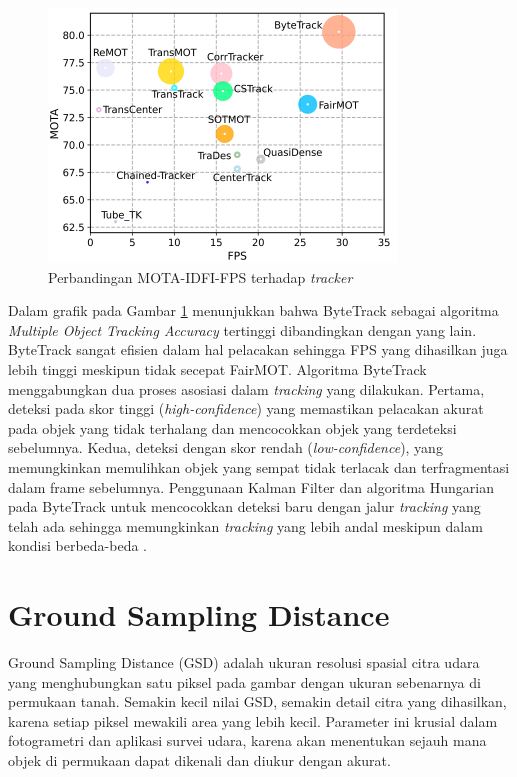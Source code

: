 \begin{figure} [H] \centering
  \includegraphics[scale=1]{bab2/mota_bytetrack.png}
  \caption{Perbandingan MOTA-IDFI-FPS terhadap \emph{tracker}}
  \label{fig:mota-tracker}
\end{figure}

Dalam grafik pada Gambar \ref{fig:mota-tracker} menunjukkan bahwa ByteTrack sebagai algoritma \emph{Multiple Object Tracking Accuracy} tertinggi dibandingkan dengan yang lain. ByteTrack sangat efisien dalam hal pelacakan sehingga FPS yang dihasilkan juga lebih tinggi meskipun tidak secepat FairMOT. Algoritma ByteTrack menggabungkan dua proses asosiasi dalam \emph{tracking} yang dilakukan. Pertama, deteksi pada skor tinggi (\emph{high-confidence}) yang memastikan pelacakan akurat pada objek yang tidak terhalang dan mencocokkan objek yang terdeteksi sebelumnya. Kedua, deteksi dengan skor rendah (\emph{low-confidence}), yang memungkinkan memulihkan objek yang sempat tidak terlacak dan terfragmentasi dalam frame sebelumnya. Penggunaan Kalman Filter dan algoritma Hungarian pada ByteTrack untuk mencocokkan deteksi baru dengan jalur \emph{tracking} yang telah ada sehingga memungkinkan \emph{tracking} yang lebih andal meskipun dalam kondisi berbeda-beda \cite{Zhang2022ByteTrack}.

\section{Ground Sampling Distance}
Ground Sampling Distance (GSD) adalah ukuran resolusi spasial citra udara yang menghubungkan satu piksel pada gambar dengan ukuran sebenarnya di permukaan tanah. Semakin kecil nilai GSD, semakin detail citra yang dihasilkan, karena setiap piksel mewakili area yang lebih kecil. Parameter ini krusial dalam fotogrametri dan aplikasi survei udara, karena akan menentukan sejauh mana objek di permukaan dapat dikenali dan diukur dengan akurat.

